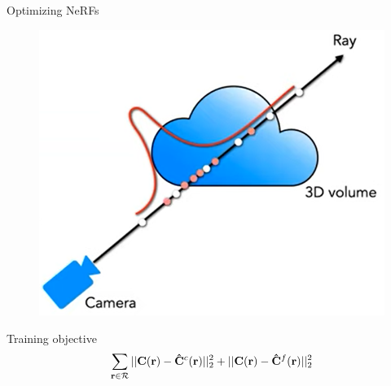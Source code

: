 \documentclass[aspectratio=1610]{beamer}
\begin{document}
\begin{frame}{Optimizing NeRFs}
    \begin{figure}
        \includegraphics[width=.3\textwidth]{coarse-fine.png}
    \end{figure}
    \bigskip
    \begin{block}{Training objective}
        \begin{equation}
            \sum_{\vb{r} \in \mathcal{R}} ||\vb{C}(\vb{r}) - \vb{\hat{C}}^c(\vb{r})||_2^2 + ||\vb{C}(\vb{r}) - \vb{\hat{C}}^f(\vb{r})||_2^2
        \end{equation}
    \end{block}
\end{frame}
\end{document}
